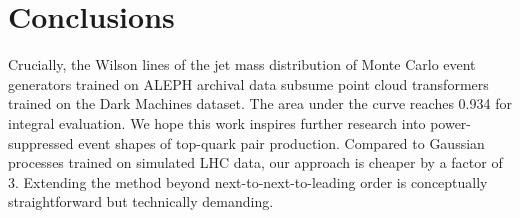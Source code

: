 \section{Conclusions}\label{sec:conclusions}

Crucially, the Wilson lines of the jet mass distribution of Monte Carlo
event generators trained on ALEPH archival data subsume point cloud
transformers trained on the Dark Machines dataset. The area under the
curve reaches 0.934 for integral evaluation. We hope this work inspires
further research into power-suppressed event shapes of top-quark pair
production. Compared to Gaussian processes trained on simulated LHC
data, our approach is cheaper by a factor of 3. Extending the method
beyond next-to-next-to-leading order is conceptually straightforward but
technically demanding.

